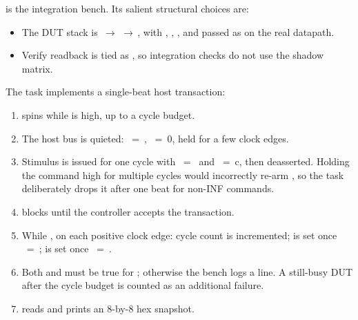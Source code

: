  is the
integration bench. Its salient structural choices are:

\begin{itemize}
    \item The DUT stack is
          \,\(\rightarrow\)\,\,\(\rightarrow\)\,,
          with , , , and 
          passed as on the real datapath.
    \item Verify readback is tied as
          , so integration
          checks do not use the shadow matrix.
\end{itemize}

The  task implements a single-beat host transaction:

\begin{enumerate}
    \item {} spins while  is
          high, up to a cycle budget.
    \item The host bus is quieted: ~=~,
          ~=~0, held for a few clock edges.
    \item Stimulus is issued for one cycle with
          ~=~ and
          ~=~c, then deasserted. Holding the command
          high for multiple cycles would incorrectly re-arm
          , so the task deliberately drops it after one
          beat for non-INF commands.
    \item {} blocks until the controller accepts the
          transaction.
    \item While , on each positive clock edge: cycle
          count is incremented;  is set once
          ~=~;  is set
          once ~=~.
    \item Both  and  must be true for
          ; otherwise the bench logs a  line.
          A still-busy DUT after the cycle budget is counted as an
          additional failure.
    \item {} reads
           and prints an 8-by-8
          hex snapshot.
\end{enumerate}


